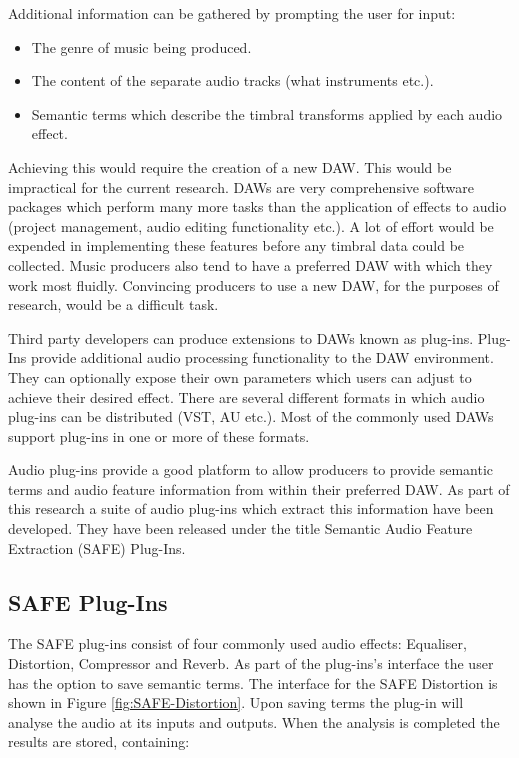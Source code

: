 		Additional information can be gathered by prompting the user for input:

		\begin{itemize}
			\item The genre of music being produced.
			\item The content of the separate audio tracks (what instruments etc.).
			\item Semantic terms which describe the timbral transforms applied by each audio
			      effect.
		\end{itemize}

		Achieving this would require the creation of a new DAW. This would be impractical for the current research.
		DAWs are very comprehensive software packages which perform many more tasks than the application of effects
		to audio (project management, audio editing functionality etc.). A lot of effort would be expended in
		implementing these features before any timbral data could be collected.  Music producers also tend to have a
		preferred DAW with which they work most fluidly. Convincing producers to use a new DAW, for the purposes of
		research, would be a difficult task.

		Third party developers can produce extensions to DAWs known as plug-ins. Plug-Ins provide additional audio
		processing functionality to the DAW environment. They can optionally expose their own parameters which users
		can adjust to achieve their desired effect. There are several different formats in which audio plug-ins can
		be distributed (VST, AU etc.). Most of the commonly used DAWs support plug-ins in one or more of these
		formats.

		Audio plug-ins provide a good platform to allow producers to provide semantic terms and audio feature
		information from within their preferred DAW. As part of this research a suite of audio plug-ins which
		extract this information have been developed. They have been released under the title Semantic Audio Feature
		Extraction (SAFE) Plug-Ins.

	\subsection{SAFE Plug-Ins}
	\label{sec:TimbreEvaluation-DAWBasedTimbreEvaluation-SAFE}
		The SAFE plug-ins consist of four commonly used audio effects: Equaliser, Distortion, Compressor and Reverb.
		As part of the plug-ins's interface the user has the option to save semantic terms. The interface for the
		SAFE Distortion is shown in Figure \ref{fig:SAFE-Distortion}. Upon saving terms the plug-in will analyse the
		audio at its inputs and outputs. When the analysis is completed the results are stored, containing:

